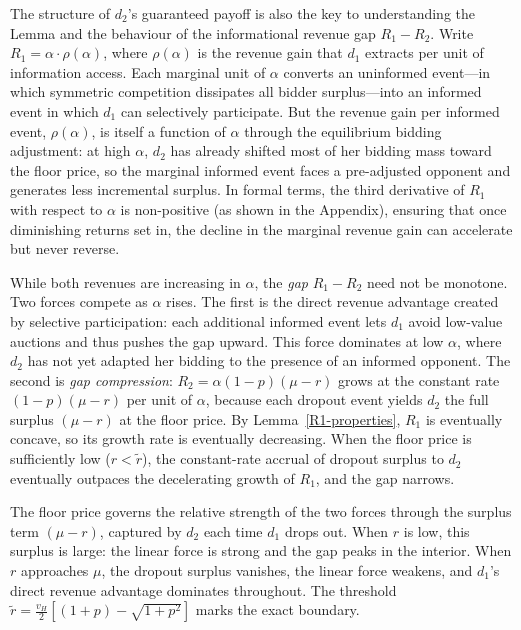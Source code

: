 \documentclass[11pt]{article}
\theoremstyle{plain}
\theoremstyle{definition}
\theoremstyle{plain}
\theoremstyle{plain}
\theoremstyle{plain}
\theoremstyle{plain}
\numberwithin{equation}{section}
\begin{document}
\vspace{0.2cm}

\noindent The structure of $d_2$'s guaranteed payoff is also the key to understanding the Lemma and the behaviour of the informational revenue gap $R_1 - R_2$. Write $R_1 = \alpha \cdot \rho(\alpha)$, where $\rho(\alpha)$ is the revenue gain that $d_1$ extracts per unit of information access. Each marginal unit of $\alpha$ converts an uninformed event---in which symmetric competition dissipates all bidder surplus---into an informed event in which $d_1$ can selectively participate. But the revenue gain per informed event, $\rho(\alpha)$, is itself a function of $\alpha$ through the equilibrium bidding adjustment: at high $\alpha$, $d_2$ has already shifted most of her bidding mass toward the floor price, so the marginal informed event faces a pre-adjusted opponent and generates less incremental surplus. In formal terms, the third derivative of $R_1$ with respect to $\alpha$ is non-positive (as shown in the Appendix), ensuring that once diminishing returns set in, the decline in the marginal revenue gain can accelerate but never reverse.

\vspace{0.2cm}

\noindent While both revenues are increasing in $\alpha$, the \emph{gap} $R_1 - R_2$ need not be monotone. Two forces compete as $\alpha$ rises. The first is the direct revenue advantage created by selective participation: each additional informed event lets $d_1$ avoid low-value auctions and thus pushes the gap upward. This force dominates at low $\alpha$, where $d_2$ has not yet adapted her bidding to the presence of an informed opponent. The second is \emph{gap compression}: $R_2 = \alpha(1-p)(\mu - r)$ grows at the constant rate $(1-p)(\mu - r)$ per unit of $\alpha$, because each dropout event yields $d_2$ the full surplus $(\mu - r)$ at the floor price. By Lemma~\ref{R1-properties}, $R_1$ is eventually concave, so its growth rate is eventually decreasing. When the floor price is sufficiently low ($r < \tilde{r}$), the constant-rate accrual of dropout surplus to $d_2$ eventually outpaces the decelerating growth of $R_1$, and the gap narrows.

\vspace{0.2cm}

\noindent The floor price governs the relative strength of the two forces through the surplus term $(\mu - r)$, captured by $d_2$ each time $d_1$ drops out. When $r$ is low, this surplus is large: the linear force is strong and the gap peaks in the interior. When $r$ approaches $\mu$, the dropout surplus vanishes, the linear force weakens, and $d_1$'s direct revenue advantage dominates throughout. The threshold $\tilde{r} = \frac{v_H}{2}\left[(1+p) - \sqrt{1+p^2}\right]$ marks the exact boundary.
\end{document}
